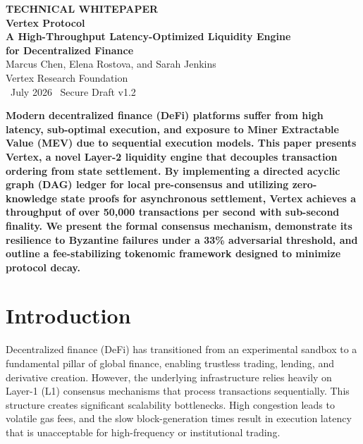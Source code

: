 \documentclass[10pt]{article}
\begin{document}
\begin{center}
    {\color{accent}\sffamily\bfseries\large TECHNICAL WHITEPAPER} \\[0.4cm]
    {\color{primary}\sffamily\Huge\bfseries Vertex Protocol} \\[0.3cm]
    {\color{textdark}\sffamily\Large\bfseries A High-Throughput Latency-Optimized Liquidity Engine\\ for Decentralized Finance} \\[0.6cm]
    {\color{textdark}\sffamily\normalsize Marcus Chen, Elena Rostova, and Sarah Jenkins} \\[0.15cm]
    {\color{textlight}\sffamily\small Vertex Research Foundation} \\[0.4cm]
    {\color{textlight}\sffamily\small \faCalendar\ July 2026 \quad \faLock\ Secure Draft v1.2}
\end{center}

\vspace{0.4cm}

\begin{tcolorbox}[
    colback=bglight,
    colframe=secondary,
    arc=4mm,
    boxrule=1.5pt,
    left=15pt, right=15pt, top=15pt, bottom=15pt,
    title={\color{white}\bfseries Abstract},
    coltitle=white,
    attach boxed title to top left={yshift=-2mm, xshift=5mm},
    boxed title style={colback=secondary, sharp corners=south}
]
\color{textdark}\small\bfseries
Modern decentralized finance (DeFi) platforms suffer from high latency, sub-optimal execution, and exposure to Miner Extractable Value (MEV) due to sequential execution models. This paper presents \textbf{Vertex}, a novel Layer-2 liquidity engine that decouples transaction ordering from state settlement. By implementing a directed acyclic graph (DAG) ledger for local pre-consensus and utilizing zero-knowledge state proofs for asynchronous settlement, Vertex achieves a throughput of over 50,000 transactions per second with sub-second finality. We present the formal consensus mechanism, demonstrate its resilience to Byzantine failures under a 33\% adversarial threshold, and outline a fee-stabilizing tokenomic framework designed to minimize protocol decay.
\end{tcolorbox}

\section{Introduction}
Decentralized finance (DeFi) has transitioned from an experimental sandbox to a fundamental pillar of global finance, enabling trustless trading, lending, and derivative creation. However, the underlying infrastructure relies heavily on Layer-1 (L1) consensus mechanisms that process transactions sequentially. This structure creates significant scalability bottlenecks. High congestion leads to volatile gas fees, and the slow block-generation times result in execution latency that is unacceptable for high-frequency or institutional trading.
\end{document}
